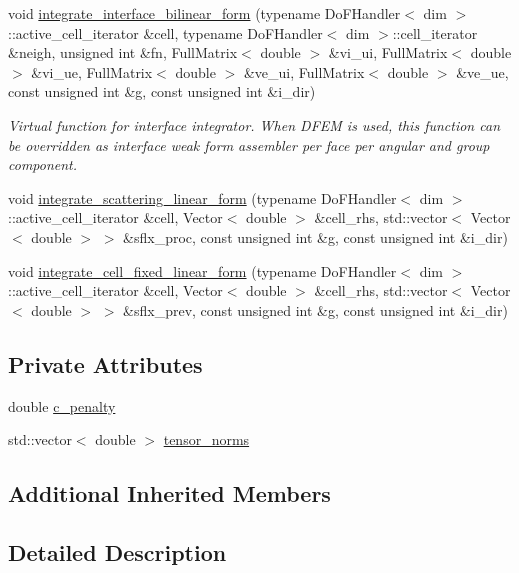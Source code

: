 \begin{DoxyCompactItemize}
void \hyperlink{class_even_parity_a0a6674c14f34f22c8ff383aee81ffabf}{integrate\+\_\+interface\+\_\+bilinear\+\_\+form} (typename Do\+F\+Handler$<$ dim $>$\+::active\+\_\+cell\+\_\+iterator \&cell, typename Do\+F\+Handler$<$ dim $>$\+::cell\+\_\+iterator \&neigh, unsigned int \&fn, Full\+Matrix$<$ double $>$ \&vi\+\_\+ui, Full\+Matrix$<$ double $>$ \&vi\+\_\+ue, Full\+Matrix$<$ double $>$ \&ve\+\_\+ui, Full\+Matrix$<$ double $>$ \&ve\+\_\+ue, const unsigned int \&g, const unsigned int \&i\+\_\+dir)
\begin{DoxyCompactList}\small\item\em Virtual function for interface integrator. When D\+F\+EM is used, this function can be overridden as interface weak form assembler per face per angular and group component. \end{DoxyCompactList}\item 
void \hyperlink{class_even_parity_a595082361e618c077877f92d04ebab0b}{integrate\+\_\+scattering\+\_\+linear\+\_\+form} (typename Do\+F\+Handler$<$ dim $>$\+::active\+\_\+cell\+\_\+iterator \&cell, Vector$<$ double $>$ \&cell\+\_\+rhs, std\+::vector$<$ Vector$<$ double $>$ $>$ \&sflx\+\_\+proc, const unsigned int \&g, const unsigned int \&i\+\_\+dir)
\item 
void \hyperlink{class_even_parity_a5efaf943f1bde0b3f9a62ea8f5dc5ff0}{integrate\+\_\+cell\+\_\+fixed\+\_\+linear\+\_\+form} (typename Do\+F\+Handler$<$ dim $>$\+::active\+\_\+cell\+\_\+iterator \&cell, Vector$<$ double $>$ \&cell\+\_\+rhs, std\+::vector$<$ Vector$<$ double $>$ $>$ \&sflx\+\_\+prev, const unsigned int \&g, const unsigned int \&i\+\_\+dir)
\end{DoxyCompactItemize}
\subsection*{Private Attributes}
\begin{DoxyCompactItemize}
\item 
double \hyperlink{class_even_parity_a0eeae2ea4837040ebd8df4a997d82acd}{c\+\_\+penalty}
\item 
std\+::vector$<$ double $>$ \hyperlink{class_even_parity_aca63481c4a5de27e6acc2fc72d802303}{tensor\+\_\+norms}
\end{DoxyCompactItemize}
\subsection*{Additional Inherited Members}


\subsection{Detailed Description}
